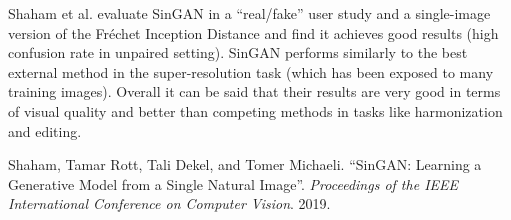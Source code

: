 \documentclass[12pt]{article}
\begin{document}
Shaham et al. evaluate SinGAN in a ``real/fake'' user study and a single-image version of the Fréchet Inception Distance and find it achieves good results (high confusion rate in unpaired setting). SinGAN performs similarly to the best external method in the super-resolution task (which has been exposed to many training images). Overall it can be said that their results are very good in terms of visual quality and better than competing methods in tasks like harmonization and editing.

\begin{thebibliography}{9}
Shaham, Tamar Rott, Tali Dekel, and Tomer Michaeli. ``SinGAN: Learning a Generative Model from a Single Natural Image''. \emph{Proceedings of the IEEE International Conference on Computer Vision}. 2019.

\end{thebibliography}
\end{document}
